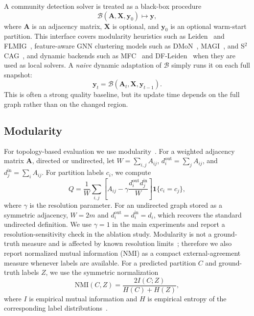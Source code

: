 \documentclass[conference]{IEEEtran}
\theoremstyle{definition}
\begin{document}
A community detection solver is treated as a black-box procedure
\begin{equation*}
    \mathcal{B}(\mathbf{A},\mathbf{X},\mathbf{y}_0) \mapsto \mathbf{y},
\end{equation*}
where $\mathbf{A}$ is an adjacency matrix, $\mathbf{X}$ is optional, and
$\mathbf{y}_0$ is an optional warm-start partition. This interface covers
modularity heuristics such as Leiden~\cite{TWE19} and FLMIG~\cite{TTB24},
feature-aware GNN clustering models such as DMoN~\cite{TPP23},
MAGI~\cite{LLC24}, and S$^2$CAG~\cite{LYZ25}, and dynamic backends such as
MFC~\cite{KZL24} and DF-Leiden~\cite{SLe24} when they are used as local
solvers.
A \textit{naive} dynamic
adaptation of $\mathcal{B}$ simply runs it on each full snapshot:
\begin{equation*}
    \mathbf{y}_t =
    \mathcal{B}(\mathbf{A}_t,\mathbf{X},\mathbf{y}_{t-1}).
\end{equation*}
This is often a strong quality baseline, but its update time depends on the
full graph rather than on the changed region.

\subsection{Modularity}
For topology-based evaluation we use modularity~\cite{NG04}. For a weighted
adjacency matrix $\mathbf{A}$, directed or undirected, let
$W=\sum_{i,j}A_{ij}$, $d_i^{\mathrm{out}}=\sum_j A_{ij}$, and
$d_j^{\mathrm{in}}=\sum_i A_{ij}$. For partition labels $c_i$, we compute
\begin{equation*}
Q = \frac{1}{W} \sum_{i,j}
\left[A_{ij} - \gamma\frac{d_i^{\mathrm{out}}d_j^{\mathrm{in}}}{W}\right]
\mathbf{1}\{c_i=c_j\},
\end{equation*}
where $\gamma$ is the resolution parameter. For an undirected graph stored as a
symmetric adjacency, $W=2m$ and $d_i^{\mathrm{out}}=d_i^{\mathrm{in}}=d_i$,
which recovers the standard undirected definition. We use $\gamma=1$ in the
main experiments and report a resolution-sensitivity check in the ablation study.
Modularity is not a ground-truth measure and is affected by known resolution
limits~\cite{G10,FH16}; therefore we also report normalized mutual information
(NMI) as a compact external-agreement measure whenever labels are available.
For a predicted partition $C$ and ground-truth labels $Z$, we use the symmetric
normalization
\begin{equation*}
\mathrm{NMI}(C,Z)=\frac{2I(C;Z)}{H(C)+H(Z)},
\end{equation*}
where $I$ is empirical mutual information and $H$ is empirical entropy of the
corresponding label distributions~\cite{Danon05}.
\end{document}
